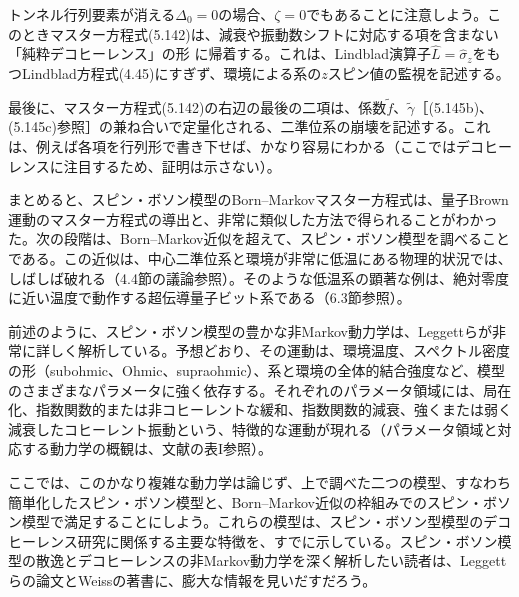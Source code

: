 トンネル行列要素が消える$\Delta_0=0$の場合、$\zeta=0$でもあることに注意しよう。このときマスター方程式(5.142)は、減衰や振動数シフトに対応する項を含まない「純粋デコヒーレンス」の形
に帰着する。これは、Lindblad演算子$\hat L=\hat\sigma_z$をもつLindblad方程式(4.45)にすぎず、環境による系の$z$スピン値の監視を記述する。

最後に、マスター方程式(5.142)の右辺の最後の二項は、係数$\widetilde f$、$\widetilde\gamma$［(5.145b)、(5.145c)参照］の兼ね合いで定量化される、二準位系の崩壊を記述する。これは、例えば各項を行列形で書き下せば、かなり容易にわかる（ここではデコヒーレンスに注目するため、証明は示さない）。

\hypertarget{srcpage:222}{}\label{srcpage:222}
まとめると、スピン・ボソン模型のBorn--Markovマスター方程式は、量子Brown運動のマスター方程式の導出と、非常に類似した方法で得られることがわかった。次の段階は、Born--Markov近似を超えて、スピン・ボソン模型を調べることである。この近似は、中心二準位系と環境が非常に低温にある物理的状況では、しばしば破れる（4.4節の議論参照）。そのような低温系の顕著な例は、絶対零度に近い温度で動作する超伝導量子ビット系である（6.3節参照）。

前述のように、スピン・ボソン模型の豊かな非Markov動力学は、Leggettら\cite{ref209}が非常に詳しく解析している。予想どおり、その運動は、環境温度、スペクトル密度の形（subohmic、Ohmic、supraohmic）、系と環境の全体的結合強度など、模型のさまざまなパラメータに強く依存する。それぞれのパラメータ領域には、局在化、指数関数的または非コヒーレントな緩和、指数関数的減衰、強くまたは弱く減衰したコヒーレント振動という、特徴的な運動が現れる（パラメータ領域と対応する動力学の概観は、文献\cite{ref209}の表I参照）。

ここでは、このかなり複雑な動力学は論じず、上で調べた二つの模型、すなわち簡単化したスピン・ボソン模型と、Born--Markov近似の枠組みでのスピン・ボソン模型で満足することにしよう。これらの模型は、スピン・ボソン型模型のデコヒーレンス研究に関係する主要な特徴を、すでに示している。スピン・ボソン模型の散逸とデコヒーレンスの非Markov動力学を深く解析したい読者は、Leggettらの論文\cite{ref209}とWeissの著書\cite{ref218}に、膨大な情報を見いだすだろう。
